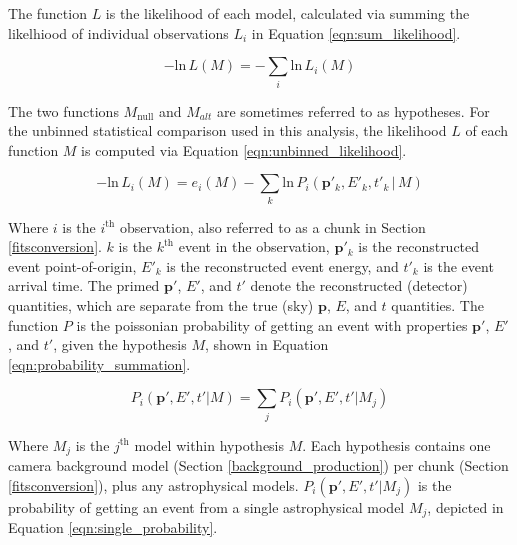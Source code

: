   The function $L$ is the likelihood of each model, calculated via summing the likelhiood of individual observations $L_i$ in Equation \ref{eqn:sum_likelihood}.
  
  \begin{equation}\label{eqn:sum_likelihood}
    - \text{ln} \, L \left(M \right ) = - \sum_i \text{ln} \, L_i \left(M \right )
  \end{equation}
  
  The two functions $M_{\text{null}}$ and $M_{alt}$ are sometimes referred to as hypotheses.
  For the unbinned statistical comparison used in this analysis, the likelihood $L$ of each function $M$ is computed via Equation \ref{eqn:unbinned_likelihood}.
  
  \begin{equation}\label{eqn:unbinned_likelihood}
    - \text{ln} \, L_i \left ( M \right ) = e_i \left ( M \right ) - \sum_k \text{ln} \, P_i \left ( \boldsymbol{p}'_k, E'_k, t'_k \, | \, M \right )
  \end{equation}
  
  Where $i$ is the $i^{\text{th}}$ observation, also referred to as a chunk in Section \ref{fitsconversion}.
  $k$ is the $k^{\text{th}}$ event in the observation, $\boldsymbol{p}'_k$ is the reconstructed event point-of-origin, $E'_k$ is the reconstructed event energy, and $t'_k$ is the event arrival time.
  The primed $\boldsymbol{p}'$, $E'$, and $t'$ denote the reconstructed (detector) quantities, which are separate from the true (sky) $\boldsymbol{p}$, $E$, and $t$ quantities.
  The function $P$ is the poissonian probability of getting an event with properties $\boldsymbol{p}'$, $E'$, and $t'$, given the hypothesis $M$, shown in Equation \ref{eqn:probability_summation}.
  
  \begin{equation}\label{eqn:probability_summation}
  P_i \left ( \boldsymbol{p}', E', t' | M \right ) = \sum_j P_i \left ( \boldsymbol{p}', E', t' | M_j \right )
  \end{equation}

  Where $M_j$ is the $j^{\text{th}}$ model within hypothesis $M$.
  Each hypothesis contains one camera background model (Section \ref{background_production}) per chunk (Section \ref{fitsconversion}), plus any astrophysical models.
  $P_i \left( \boldsymbol{p}', E', t' | M_j \right )$ is the probability of getting an event from a single astrophysical model $M_j$, depicted in Equation \ref{eqn:single_probability}.
  
